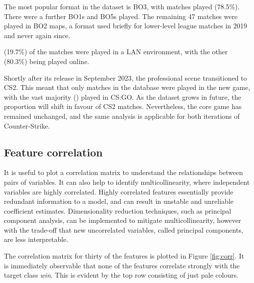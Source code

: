 The most popular format in the dataset is BO3, with \matchesBoThree{} matches played (78.5\%). There were a further \matchesBoOne{} BO1s and \matchesBoFive{} BO5s played. The remaining 47 matches were played in BO2 maps, a format used briefly for lower-level league matches in 2019 and never again since. 

\matchesLAN{} (19.7\%) of the matches were played in a LAN environment, with the other \matchesOnline{} (80.3\%) being played online. 

Shortly after its release in September 2023, the professional scene transitioned to CS2. This meant that only \matchesCSTwo{} matches in the database were played in the new game, with the vast majority (\matchesCSGO{}) played in CS:GO. As the dataset grows in future, the proportion will shift in favour of CS2 matches. Nevertheless, the core game has remained unchanged, and the same analysis is applicable for both iterations of Counter-Strike.

\newpage

\subsection{Feature correlation}

It is useful to plot a correlation matrix to understand the relationships between pairs of variables. It can also help to identify multicollinearity, where independent variables are highly correlated. Highly correlated features essentially provide redundant information to a model, and can result in unstable and unreliable coefficient estimates. Dimensionality reduction techniques, such as principal component analysis, can be implemented to mitigate multicollinearity, however with the trade-off that new uncorrelated variables, called principal components, are less interpretable.

The correlation matrix for thirty of the features is plotted in Figure \ref{fig:corr}. It is immediately observable that none of the features correlate strongly with the target class \textit{win}. This is evident by the top row consisting of just pale colours. 

